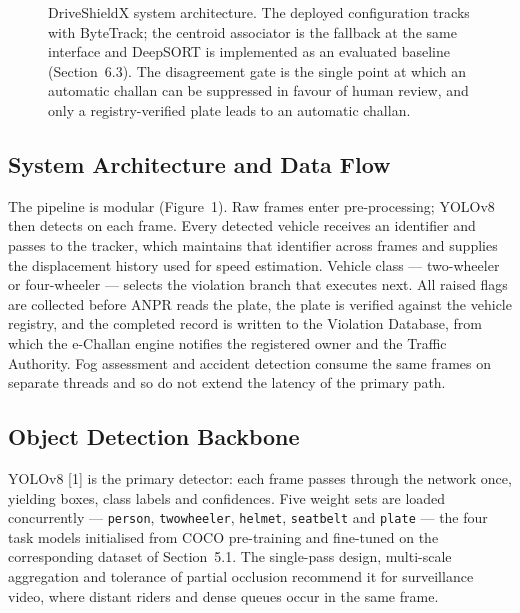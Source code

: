 \documentclass[10pt,a4paper,twocolumn]{article}
\newcommand{\code}[1]{\texttt{#1}}
\begin{document}
\begin{figure}[t]
{}
\caption{DriveShieldX system architecture. The deployed configuration tracks with ByteTrack; the centroid associator
is the fallback at the same interface and DeepSORT is implemented as an evaluated baseline (Section~6.3). The
disagreement gate is the single point at which an automatic challan can be suppressed in favour of human review, and
only a registry-verified plate leads to an automatic challan.}
\end{figure}

\subsection{System Architecture and Data Flow}
The pipeline is modular (Figure~1). Raw frames enter pre-processing; YOLOv8 then detects on each frame. Every
detected vehicle receives an identifier and passes to the tracker, which maintains that identifier across frames and
supplies the displacement history used for speed estimation. Vehicle class --- two-wheeler or four-wheeler --- selects
the violation branch that executes next. All raised flags are collected before ANPR reads the plate, the plate is
verified against the vehicle registry, and the completed record is written to the Violation Database, from which the
e-Challan engine notifies the registered owner and the Traffic Authority. Fog assessment and accident detection
consume the same frames on separate threads and so do not extend the latency of the primary path.

\subsection{Object Detection Backbone}
YOLOv8 [1] is the primary detector: each frame passes through the network once, yielding boxes, class labels and
confidences. Five weight sets are loaded concurrently --- \code{person}, \code{twowheeler}, \code{helmet},
\code{seatbelt} and \code{plate} --- the four task models initialised from COCO pre-training and fine-tuned on the
corresponding dataset of Section~5.1. The single-pass design, multi-scale aggregation and tolerance of partial
occlusion recommend it for surveillance video, where distant riders and dense queues occur in the same frame.
\end{document}
